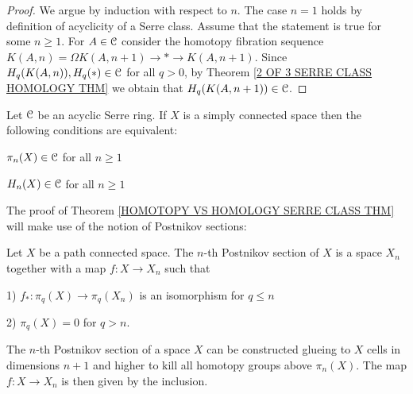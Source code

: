 \begin{proof}
We argue by induction with respect to $n$. 
The case $n=1$ holds by definition of acyclicity of a Serre class. Assume 
that the statement is true for some $n\geq 1$. For $A\in {\mathcal C}$ consider 
the homotopy fibration sequence $K(A, n) = \Omega K(A, n+1) \to \ast \to K(A, n+1)$. 
Since $H_{q}(K(A, n)), H_{q}(\ast) \in {\mathcal C}$ for all $q>0$, by   
Theorem \ref{2 OF 3 SERRE CLASS HOMOLOGY THM} we obtain that $H_{q}(K(A, n+1))\in {\mathcal C}$. 
\end{proof}



\begin{theorem}
\label{HOMOTOPY VS HOMOLOGY SERRE CLASS THM}
Let ${\mathcal C}$ be an acyclic Serre ring. If $X$ is a simply connected space then the following 
conditions are equivalent:
\benu
\item $\pi_{n}(X)\in {\mathcal C}$ for all $n\geq 1$ 
\item $H_{n}(X)\in {\mathcal C}$ for all $n\geq 1$
\eenu  
\end{theorem}


The proof of Theorem \ref{HOMOTOPY VS HOMOLOGY SERRE CLASS THM} will make 
use of the notion of Postnikov sections:

\begin{definition}
\label{POSTNIKOV SECTION DEF}
Let $X$ be a path connected space. The $n$-th Postnikov section of $X$ 
is a space $X_{n}$ together with a map $f\colon X \to X_{n}$ such that
\benu
\item[1)] $f_{\ast}\colon \pi_{q}(X) \to \pi_{q}(X_{n})$ is an isomorphism 
for $q \leq n$
\item[2)] $\pi_{q}(X) = 0$ for $q > n$. 
\eenu
\end{definition} 

The $n$-th Postnikov section of a space $X$ can be constructed glueing to 
$X$ cells in dimensions $n+1$ and higher to kill all homotopy groups above 
$\pi_{n}(X)$. The map $f\colon X\to X_{n}$ is then given by the inclusion.


